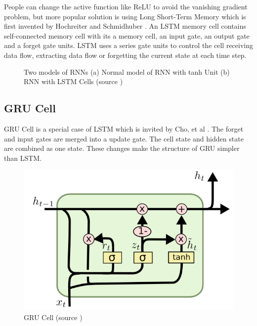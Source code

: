   People can change the active function like ReLU to avoid the vanishing gradient problem, but more popular solution is using Long Short-Term Memory which is first invented by Hochreiter and Schmidhuber \cite{hochreiter1997long}.      
   An LSTM memory cell contains self-connected memory cell with its a memory cell, an input gate, an output gate and a forget gate units. LSTM uses a series gate units to control the cell receiving data flow, extracting data flow or forgetting the current state at each time step. 



\begin{figure}[!h]

  \centering


\caption{Two models of RNNs (a) Normal model of RNN with tanh Unit (b) RNN with LSTM Cells (source \cite{olah2015understanding}) }
\label{fig:SISModel}
\end{figure}

\subsection{GRU Cell} %
GRU Cell is a special case of LSTM which is invited by  Cho, et al \cite{cho2014learning}.  The forget and input gates are merged into a update gate. The cell state and hidden state are combined as one state. These changes make the structure of GRU simpler than LSTM.

\begin{figure}[!h]
\centering
\includegraphics[width=0.55\columnwidth]{images/GRU.png}
\caption{GRU Cell  (source \cite{olah2015understanding})  }
\label{fig:GRU}
\end{figure}

